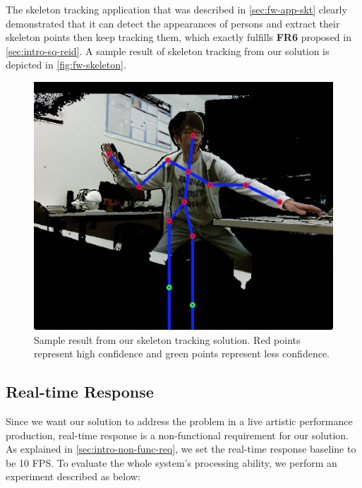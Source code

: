 The skeleton tracking application that was described in \autoref{sec:fw-app-skt}
clearly demonstrated that it can detect the appearances of persons and
extract their skeleton points then keep tracking them, which exactly fulfills
\textbf{FR6} proposed in \autoref{sec:intro-sq-reid}. A sample result of 
skeleton tracking from our solution is depicted in \autoref{fig:fw-skeleton}.

\begin{figure}
    \begin{center}
        \includegraphics[scale=0.3]{figures/framework_skeleton.png}
    \end{center}
    \caption[Sample result from our skeleton tracking solution]
    {Sample result from our skeleton tracking solution. 
        Red points represent high confidence and green points represent less 
        confidence.}
    \label{fig:fw-skeleton}
\end{figure}

\subsection{Real-time Response}
\label{sec:Eval-framework-rt-acc}

Since we want our solution to address the problem in a live artistic 
performance production, real-time response is a non-functional 
requirement for our solution. As explained in \autoref{sec:intro-non-func-req},
we set the real-time response baseline to be 10 FPS.
To evaluate the whole system's processing ability, we perform an 
experiment described as below:

